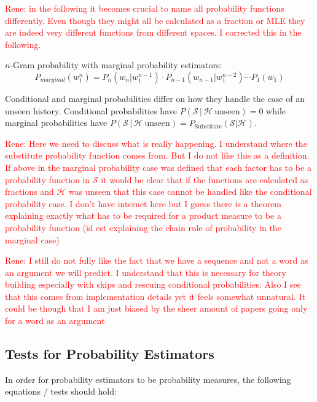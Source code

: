 \documentclass[11pt,a4paper]{article}
\newcommand{\Seq}{\mathcal{S}}
\newcommand{\Hist}{\mathcal{H}}
\newcommand{\rp}[1]{\textcolor{red}{Rene: #1}}
\begin{document}
  \rp{in the following it becomes crucial to name all probability functions
  differently. Even though they might all be calculated as a fraction or MLE
  they are indeed very different functions from different spaces. I corrected
  this in the following.}

  $n$-Gram probability with marginal probability estimators:
  \begin{equation}
    P_{marginal}(w_1^n) = P_n(w_n | w_1^{n-1}) \cdot P_{n-1}(w_{n-1} | w_1^{n-2}) \dotsm P_1(w_1)
  \end{equation}

  Conditional and marginal probabilities differ  on how they handle the case of
  an unseen history. Conditional probabilities have
  $P(\Seq \, | \, \Hist \: \mathrm{unseen}) = 0$
  while marginal probabilities have
  $P(\Seq \, | \, \Hist \: \mathrm{unseen}) = P_\mathrm{Substitute}(\Seq | \Hist)$.

  \rp{Here we need to discuss what is really happening. I understand where the
  substitute probability function comes from. But I do not like this as a
  definition. If above in the marginal probability case was defined that each
  factor has to be a probability function in $\Seq$ it would be clear that if
  the functions are calculated as fractions and $\Hist$ was unseen that this
  case cannot be handled like the conditional probability case. I don't have
  internet here but I guess there is a theorem explaining exactly what has to be
  required for a product measure to be a probability function (id est explaining
  the chain rule of probability in the marginal case)}

  \rp{I still do not fully like the fact that we have a sequence and not a word
  as an argument we will predict. I understand that this is necessary for theory
  building especially with skips and rescuing conditional probabilities. Also I
  see that this comes from implementation details yet it feels somewhat
  unnatural. It could be though that I am just biased by the sheer amount of
  papers going only for a word as an argument}

  \subsection{Tests for Probability Estimators}

  In order for probability estimators to be probability measures, the
  following equations / tests should hold:
\end{document}
